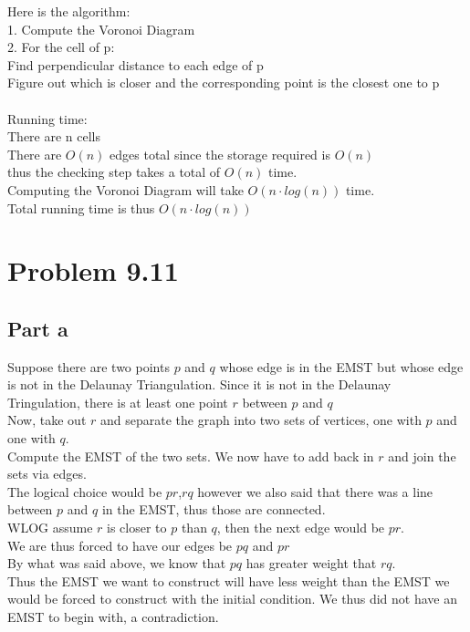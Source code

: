 \documentclass[11pt,psfig]{article}
\begin{document}
Here is the algorithm:\\
1. Compute the Voronoi Diagram\\
2. For the cell of p:\\
Find perpendicular distance to each edge of p\\
Figure out which is closer and the corresponding point is the closest one to p\\
\\
Running time:\\
There are n cells\\
There are $O(n)$ edges total since the storage required is $O(n)$\\
thus the checking step takes a total of $O(n)$ time. \\
Computing the Voronoi Diagram will take $O(n \cdot log(n))$ time. \\
Total running time is thus $O(n \cdot log(n))$

\section*{Problem 9.11}

\subsection*{Part a}
Suppose there are two points $p$ and $q$ whose edge is in the EMST but whose edge is not in the Delaunay Triangulation. Since it is not in the Delaunay Tringulation, there is at least one point $r$ between $p$ and $q$\\
Now, take out $r$ and separate the graph into two sets of vertices, one with $p$ and one with $q$. \\
Compute the EMST of the two sets. We now have to add back in $r$ and join the sets via edges. \\
The logical choice would be $pr$,$rq$ however we also said that there was a line between $p$ and $q$ in the EMST, thus those are connected. \\
WLOG assume $r$ is closer to $p$ than $q$, then the next edge would be $pr$. \\
We are thus forced to have our edges be $pq$ and $pr$\\
By what was said above, we know that $pq$ has greater weight that $rq$. \\
Thus the EMST we want to construct will have less weight than the EMST we would be forced to construct with the initial condition. 
We thus did not have an EMST to begin with, a contradiction.
\end{document}
